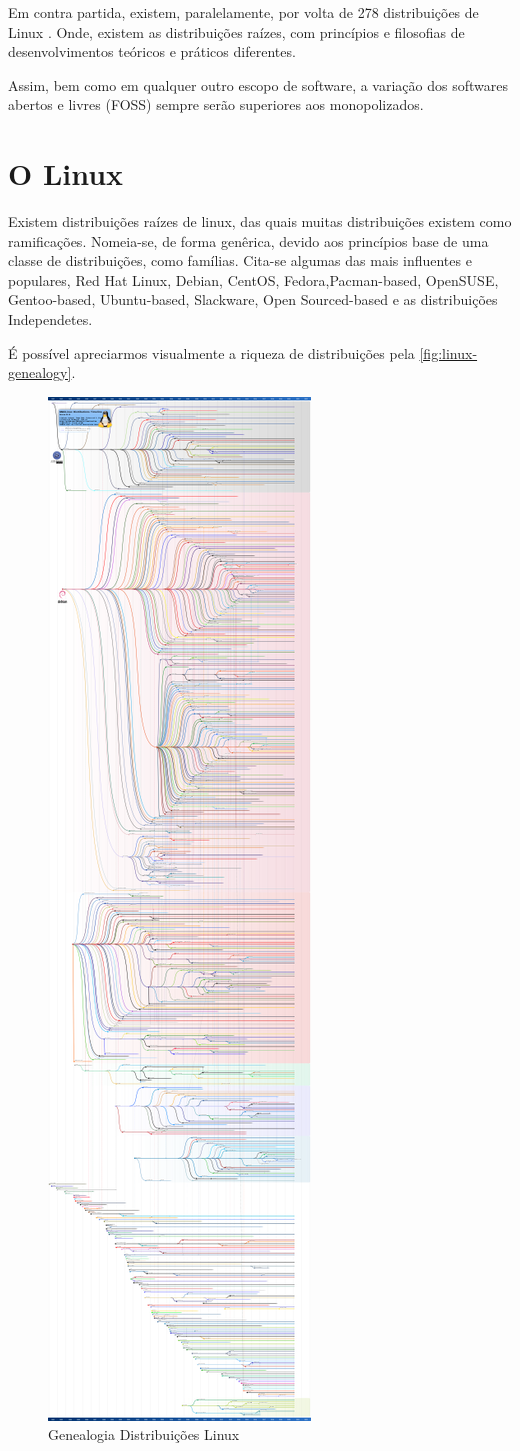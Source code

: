 \documentclass[
12pt,				%
openright,			%
oneside,			%
a4paper,			%
english,			%
french,				%
spanish,			%
brazil,				%
]{abntex2}
\begin{document}
Em contra partida, existem, paralelamente, por volta de 278 distribuições de Linux \cite{wikipedia_2021Linux}. Onde, existem as distribuições raízes, com princípios e filosofias de desenvolvimentos teóricos e práticos diferentes.

Assim, bem como em qualquer outro escopo de software, a variação dos softwares abertos e livres (FOSS) sempre serão superiores aos monopolizados.


\section{O Linux}

Existem distribuições raízes de linux, das quais muitas distribuições existem como ramificações. Nomeia-se, de forma genêrica, devido aos princípios base de uma classe de distribuições, como famílias. Cita-se algumas das mais influentes e populares, Red Hat Linux, Debian, CentOS, Fedora,Pacman-based, OpenSUSE, Gentoo-based, Ubuntu-based, Slackware, Open Sourced-based e as distribuições Independetes.

É possível apreciarmos visualmente a riqueza de distribuições pela \autoref{fig:linux-genealogy}.

\begin{figure}[!htb]
  \caption{\label{fig:linux-genealogy} Genealogia Distribuições Linux}
  \includegraphics[height=\textwidth, angle=-90]{diversidade}
\end{figure}
\end{document}
